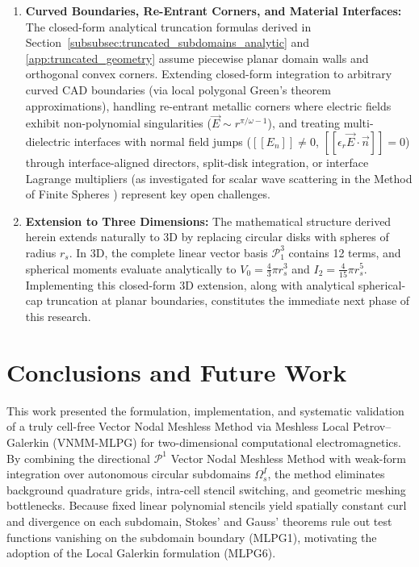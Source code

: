 \documentclass[VANCOUVER,Times1COL]{WileyNJD-v5}
\begin{document}
\begin{enumerate}
    \item \textbf{Curved Boundaries, Re-Entrant Corners, and Material Interfaces:} The closed-form analytical truncation formulas derived in Section~\ref{subsubsec:truncated_subdomains_analytic} and \ref{app:truncated_geometry} assume piecewise planar domain walls and orthogonal convex corners. Extending closed-form integration to arbitrary curved CAD boundaries (via local polygonal Green's theorem approximations), handling re-entrant metallic corners where electric fields exhibit non-polynomial singularities ($\vec{E} \sim r^{\pi/\omega - 1}$), and treating multi-dielectric interfaces with normal field jumps ($[\![ E_n ]\!] \ne 0$, $[\![ \epsilon_r \vec{E} \cdot \vec{n} ]\!] = 0$) through interface-aligned directors, split-disk integration, or interface Lagrange multipliers (as investigated for scalar wave scattering in the Method of Finite Spheres \cite{nicomedes2021acoustic}) represent key open challenges.
    \item \textbf{Extension to Three Dimensions:} The mathematical structure derived herein extends naturally to 3D by replacing circular disks with spheres of radius $r_s$. In 3D, the complete linear vector basis $\mathcal{P}_1^3$ contains 12 terms, and spherical moments evaluate analytically to $V_0 = \frac{4}{3}\pi r_s^3$ and $I_2 = \frac{4}{15}\pi r_s^5$. Implementing this closed-form 3D extension, along with analytical spherical-cap truncation at planar boundaries, constitutes the immediate next phase of this research.
\end{enumerate}

\section{Conclusions and Future Work}
\label{sec:conclusions}

This work presented the formulation, implementation, and systematic validation of a truly cell-free Vector Nodal Meshless Method via Meshless Local Petrov--Galerkin (VNMM-MLPG) for two-dimensional computational electromagnetics. By combining the directional $\mathcal{P}^1$ Vector Nodal Meshless Method \cite{ortiz2021nodal, stable_vnmm2d_2026} with weak-form integration over autonomous circular subdomains $\Omega_s^I$, the method eliminates background quadrature grids, intra-cell stencil switching, and geometric meshing bottlenecks. Because fixed linear polynomial stencils yield spatially constant curl and divergence on each subdomain, Stokes' and Gauss' theorems rule out test functions vanishing on the subdomain boundary (MLPG1), motivating the adoption of the Local Galerkin formulation (MLPG6).
\end{document}
